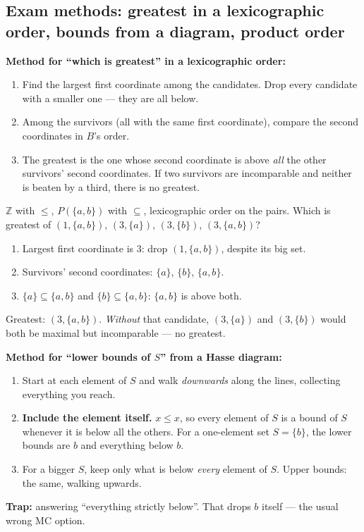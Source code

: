 \documentclass{fkt-notes}
\theoremstyle{definition}
\begin{document}
\subsection{Exam methods: greatest in a lexicographic order, bounds from a diagram, product order}
%
\textbf{Method for ``which is greatest'' in a lexicographic order:}
\begin{enumerate}[nosep]
  \item Find the largest first coordinate among the candidates. Drop
        every candidate with a smaller one --- they are all below.
  \item Among the survivors (all with the same first coordinate),
        compare the second coordinates in $B$'s order.
  \item The greatest is the one whose second coordinate is above
        \emph{all} the other survivors' second coordinates. If two
        survivors are incomparable and neither is beaten by a third,
        there is no greatest.
\end{enumerate}

\begin{example}
  $\mathbb{Z}$ with $\le$, $P(\{a,b\})$ with $\subseteq$, lexicographic
  order on the pairs. Which is greatest of $(1, \{a,b\})$, $(3, \{a\})$,
  $(3, \{b\})$, $(3, \{a,b\})$?
  \begin{enumerate}[nosep]
    \item Largest first coordinate is $3$: drop $(1, \{a,b\})$, despite
          its big set.
    \item Survivors' second coordinates: $\{a\}$, $\{b\}$, $\{a,b\}$.
    \item $\{a\} \subseteq \{a,b\}$ and $\{b\} \subseteq \{a,b\}$:
          $\{a,b\}$ is above both.
  \end{enumerate}
  Greatest: $(3, \{a,b\})$. \emph{Without} that candidate, $(3,\{a\})$ and
  $(3,\{b\})$ would both be maximal but incomparable --- no greatest.
\end{example}

\textbf{Method for ``lower bounds of $S$'' from a Hasse diagram:}
%
\begin{enumerate}[nosep]
  \item Start at each element of $S$ and walk \emph{downwards} along
        the lines, collecting everything you reach.
  \item \textbf{Include the element itself.} $x \le x$, so every element
        of $S$ is a bound of $S$ whenever it is below all the others.
        For a one-element set $S = \{b\}$, the lower bounds are $b$ and
        everything below $b$.
  \item For a bigger $S$, keep only what is below \emph{every} element
        of $S$. Upper bounds: the same, walking upwards.
\end{enumerate}
\textbf{Trap:} answering ``everything strictly below''. That drops $b$
itself --- the usual wrong MC option.
\end{document}
